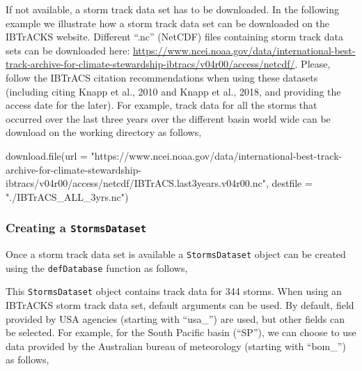 \documentclass[
]{article}
\newenvironment{Shaded}{\begin{snugshade}}{\end{snugshade}}
\newcommand{\AttributeTok}[1]{\textcolor[rgb]{0.77,0.63,0.00}{#1}}
\newcommand{\ConstantTok}[1]{\textcolor[rgb]{0.00,0.00,0.00}{#1}}
\newcommand{\FunctionTok}[1]{\textcolor[rgb]{0.00,0.00,0.00}{#1}}
\newcommand{\NormalTok}[1]{#1}
\newcommand{\OtherTok}[1]{\textcolor[rgb]{0.56,0.35,0.01}{#1}}
\newcommand{\SpecialCharTok}[1]{\textcolor[rgb]{0.00,0.00,0.00}{#1}}
\newcommand{\StringTok}[1]{\textcolor[rgb]{0.31,0.60,0.02}{#1}}
\begin{document}
If not available, a storm track data set has to be downloaded. In the
following example we illustrate how a storm track data set can be
downloaded on the IBTrACKS website. Different ``.nc'' (NetCDF) files
containing storm track data sets can be downloaded here:
\url{https://www.ncei.noaa.gov/data/international-best-track-archive-for-climate-stewardship-ibtracs/v04r00/access/netcdf/}.
Please, follow the IBTrACS citation recommendations when using these
datasets (including citing Knapp et al., 2010 and Knapp et al., 2018,
and providing the access date for the later). For example, track data
for all the storms that occurred over the last three years over the
different basin world wide can be download on the working directory as
follows,

\begin{Shaded}
\begin{Highlighting}[]
\FunctionTok{download.file}\NormalTok{(}\AttributeTok{url =} \StringTok{"https://www.ncei.noaa.gov/data/international{-}best{-}track{-}archive{-}for{-}climate{-}stewardship{-}ibtracs/v04r00/access/netcdf/IBTrACS.last3years.v04r00.nc"}\NormalTok{, }\AttributeTok{destfile =} \StringTok{"./IBTrACS\_ALL\_3yrs.nc"}\NormalTok{)}
\end{Highlighting}
\end{Shaded}

\hypertarget{creating-a-stormsdataset}{%
\subsubsection{\texorpdfstring{Creating a
\texttt{StormsDataset}}{Creating a StormsDataset}}\label{creating-a-stormsdataset}}

Once a storm track data set is available a \texttt{StormsDataset} object
can be created using the \texttt{defDatabase} function as follows,

\begin{Shaded}
\end{Shaded}

This \texttt{StormsDataset} object contains track data for 344 storms.
When using an IBTrACKS storm track data set, default arguments can be
used. By default, field provided by USA agencies (starting with
``usa\_'') are used, but other fields can be selected. For example, for
the South Pacific basin (``SP''), we can choose to use data provided by
the Australian bureau of meteorology (starting with ``bom\_'') as
follows,
\end{document}

